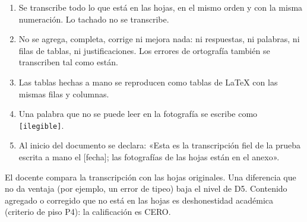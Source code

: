 \documentclass[11pt]{article}
\begin{document}
\begin{cajaaviso}[title={Reglas de la transcripción fiel}]

	\begin{enumerate}[label=\textbf{R\arabic*.},leftmargin=24pt,itemsep=2pt]

		\item Se transcribe todo lo que está en las hojas, en el mismo orden y con la misma numeración. Lo tachado no se transcribe.

		\item No se agrega, completa, corrige ni mejora nada: ni respuestas, ni palabras, ni filas de tablas, ni justificaciones. Los errores de ortografía también se transcriben tal como están.

		\item Las tablas hechas a mano se reproducen como tablas de \LaTeX{} con las mismas filas y columnas.

		\item Una palabra que no se puede leer en la fotografía se escribe como \texttt{[ilegible]}.

		\item Al inicio del documento se declara: «Esta es la transcripción fiel de la prueba escrita a mano el [fecha]; las fotografías de las hojas están en el anexo».

	\end{enumerate}

	El docente compara la transcripción con las hojas originales. Una diferencia que no da ventaja (por ejemplo, un error de tipeo) baja el nivel de D5. Contenido agregado o corregido que no está en las hojas es deshonestidad académica (criterio de piso P4): la calificación es CERO.

\end{cajaaviso}
\end{document}
